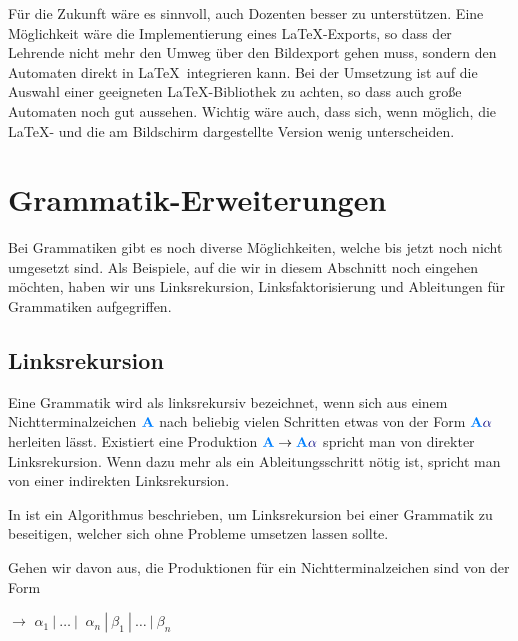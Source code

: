 Für die Zukunft wäre es sinnvoll, auch Dozenten besser zu
unterstützen. Eine Möglichkeit wäre die Implementierung eines \LaTeX-Exports, so
dass der Lehrende nicht mehr den Umweg über den Bildexport gehen muss, sondern
den Automaten direkt in \LaTeX\ integrieren kann. Bei der Umsetzung ist auf die
Auswahl einer geeigneten \LaTeX-Bibliothek zu achten, so dass auch große
Automaten noch gut aussehen. Wichtig wäre auch, dass sich, wenn möglich, die
\LaTeX- und die am Bildschirm dargestellte Version wenig
unterscheiden.\vspace{10pt}


\section{Grammatik-Erweiterungen}\label{PerspectiveGrammar}

Bei Grammatiken gibt es noch diverse Möglichkeiten, welche bis jetzt noch nicht
umgesetzt sind. Als Beispiele, auf die wir in diesem Abschnitt noch eingehen
möchten, haben wir uns Linksrekursion, Linksfaktorisierung und
Ableitungen für Grammatiken aufgegriffen.\vspace{10pt}


\subsection{Linksrekursion}\label{PerspectiveLeftrecursion}

Eine Grammatik wird als linksrekursiv bezeichnet, wenn sich aus einem
Nichtterminalzeichen $\NonterminalSymbol{A}$ nach beliebig vielen Schritten etwas
von der Form $\NonterminalSymbol{A} \TerminalSymbol{$\alpha$}$ herleiten lässt.
Existiert eine Produktion $\NonterminalSymbol{A} \to \NonterminalSymbol{A}
\TerminalSymbol{$\alpha$}$ spricht man von direkter Linksrekursion. Wenn dazu
mehr als ein Ableitungsschritt nötig ist, spricht man von einer indirekten
Linksrekursion.\vspace{10pt}

In \cite{Compilers} ist ein Algorithmus beschrieben, um Linksrekursion
bei einer Grammatik zu beseitigen, welcher sich ohne Probleme umsetzen lassen
sollte.\vspace{10pt}

\noindent Gehen wir davon aus, die Produktionen für ein Nichtterminalzeichen
 sind von der Form\vspace{10pt}

 $\to$ $\alpha_1\ |\ \ldots\ |\ $
$\alpha_n\ |\ \beta_1\ |\ \ldots\ |\ \beta_n$\vspace{10pt}


